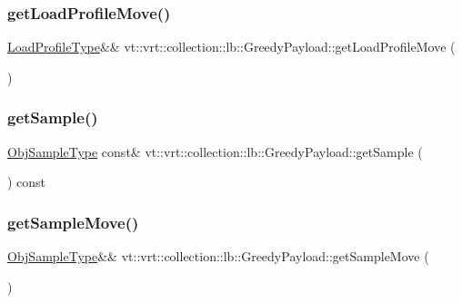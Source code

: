 \subsubsection{\texorpdfstring{get\+Load\+Profile\+Move()}{getLoadProfileMove()}}
{\footnotesize\ttfamily \hyperlink{structvt_1_1vrt_1_1collection_1_1lb_1_1_greedy_l_b_types_a8af324cd88e83727178631e4d1478932}{Load\+Profile\+Type}\&\& vt\+::vrt\+::collection\+::lb\+::\+Greedy\+Payload\+::get\+Load\+Profile\+Move (\begin{DoxyParamCaption}{ }\end{DoxyParamCaption})\hspace{0.3cm}{\ttfamily [inline]}}

\mbox{\label{structvt_1_1vrt_1_1collection_1_1lb_1_1_greedy_payload_aeb49fabc4eb3b15bf698309c651abafe}} 
\subsubsection{\texorpdfstring{get\+Sample()}{getSample()}}
{\footnotesize\ttfamily \hyperlink{structvt_1_1vrt_1_1collection_1_1lb_1_1_greedy_l_b_types_a467f8a79d0785fca5fc95bd5c0f406b9}{Obj\+Sample\+Type} const\& vt\+::vrt\+::collection\+::lb\+::\+Greedy\+Payload\+::get\+Sample (\begin{DoxyParamCaption}{ }\end{DoxyParamCaption}) const\hspace{0.3cm}{\ttfamily [inline]}}

\mbox{\label{structvt_1_1vrt_1_1collection_1_1lb_1_1_greedy_payload_a294dcb18ec60ae644f5a5112bbd2987a}} 
\subsubsection{\texorpdfstring{get\+Sample\+Move()}{getSampleMove()}}
{\footnotesize\ttfamily \hyperlink{structvt_1_1vrt_1_1collection_1_1lb_1_1_greedy_l_b_types_a467f8a79d0785fca5fc95bd5c0f406b9}{Obj\+Sample\+Type}\&\& vt\+::vrt\+::collection\+::lb\+::\+Greedy\+Payload\+::get\+Sample\+Move (\begin{DoxyParamCaption}{ }\end{DoxyParamCaption})\hspace{0.3cm}{\ttfamily [inline]}}


